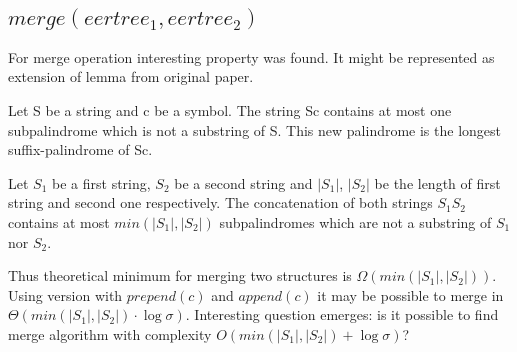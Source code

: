 \subsection{$merge(eertree_1, eertree_2)$}
For merge operation interesting property was found. It might be represented as extension of lemma from original paper.
\begin{lemma}
Let S be a string and c be a symbol. The string
Sc contains at most one subpalindrome which is not a substring of S.  This new palindrome is the longest suffix-palindrome of Sc.
\end{lemma}

\begin{proposition}
Let $S_1$ be a first string, $S_2$ be a second string and $\lvert S_1 \rvert$, $\lvert S_2 \rvert$ be the length of first string and second one respectively. The concatenation of both strings $S_1S_2$ contains at most $min(\lvert S_1 \rvert, \lvert S_2 \rvert)$ subpalindromes which are not a substring of $S_1$ nor $S_2$. 
\end{proposition}

Thus theoretical minimum for merging two structures is $\Omega(min(\lvert S_1 \rvert, \lvert S_2 \rvert))$. Using version with $prepend(c)$ and $append(c)$ it may be possible to merge in $\Theta(min(\lvert S_1 \rvert, \lvert S_2 \rvert) \cdot \log \sigma)$.  Interesting question emerges: is it possible to find merge algorithm with complexity $O(min(\lvert S_1 \rvert, \lvert S_2 \rvert) + \log \sigma)$?

